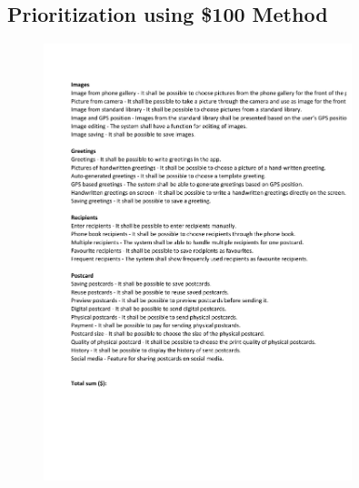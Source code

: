 \documentclass[10pt,a4paper]{article}
\begin{document}
\newpage
\begin{appendices}

\section{Prioritization using \$100 Method}
\begin{figure}[h!]
\centering
\includegraphics[width=0.8\textwidth]{100Method.pdf}
\end{figure}


\end{appendices}
\end{document}
